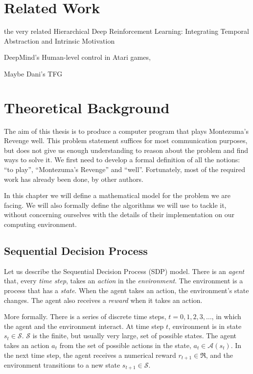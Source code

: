 \documentclass[12pt,a4paper,oneside]{report}
\begin{document}
\chapter{Related Work}
  the very related Hierarchical Deep Reinforcement Learning: Integrating Temporal Abstraction and Intrinsic Motivation

  DeepMind's Human-level control in Atari games, 

  Maybe Dani's TFG

\chapter{Theoretical Background}
The aim of this thesis is to produce a computer program that plays Montezuma's
Revenge well. This problem statement suffices for most communication purposes,
but does not give us enough understanding to reason about the problem and find
ways to solve it. We first need to develop a formal definition of all the
notions: ``to play'', ``Montezuma's Revenge'' and ``well''. Fortunately, most of
the required work has already been done, by other authors.

In this chapter we will define a mathematical model for the problem we are
facing. We will also formally define the algorithms we will use to tackle it,
without concerning ourselves with the details of their implementation on our
computing environment.

\section{Sequential Decision Process}
Let us describe the Sequential Decision Process (SDP) model. There is an
\emph{agent} that, every \emph{time step}, takes an \emph{action} in the
\emph{environment}. The environment is a process that has a \emph{state}. When
the agent takes an action, the environment's state changes. The agent also
receives a \emph{reward} when it takes an action.

More formally. There is a series of discrete time steps, $t=0,1,2,3,\dots$, in
which the agent and the environment interact. At time step $t$, environment is
in state $s_t \in \mathcal{S}$. $\mathcal{S}$ is the finite, but usually very
large, set of possible states. The agent takes an action $a_t$ from the set of
possible actions in the state, $a_t \in \mathcal{A}(s_t)$. In the next time
step, the agent receives a numerical reward $r_{t+1} \in \mathfrak{R}$, and the
environment transitions to a new state $s_{t+1} \in \mathcal{S}$.
\end{document}
